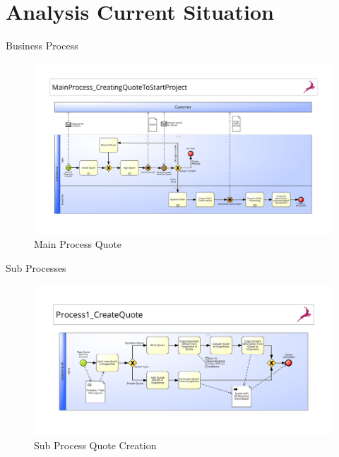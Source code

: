 \documentclass[utf8, xcolor, usenames,dvipsnames, aspectratio=169]{beamer}
\begin{document}
\section{Analysis Current Situation}
\begin{frame}{Business Process}
	\begin{figure}[t]
		\centering
		\includegraphics[height=\dimexpr11\textheight/16\relax]{./images/0_main}
		\caption{Main Process Quote}
	\end{figure}
\end{frame}

\begin{frame}{Sub Processes}
	\begin{figure}[t]
		\centering
		\includegraphics[height=\dimexpr11\textheight/16\relax]{./images/0-1_createQuote}
		\caption{Sub Process Quote Creation}
	\end{figure}
\end{frame}
\end{document}
